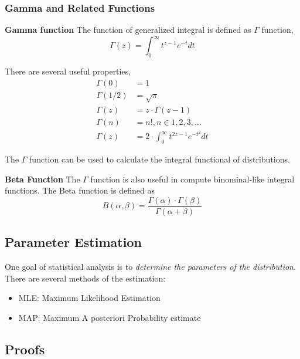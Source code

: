 \documentclass[../main.tex]{subfiles}
\begin{document}
\subsubsection{Gamma and Related Functions}
\textbf{Gamma function}
The function of generalized integral is defined as $\Gamma$ function,
\begin{equation}
    \label{Definition: Gamma function}
    \Gamma(z) = \int_{0}^{\infty} t^{z-1} e^{-t} dt
\end{equation}

There are several useful properties,
\begin{equation}
    \label{Property: Gamma function}
    \begin{split}
        \Gamma(0) & = 1 \\
        \Gamma(1/2) & = \sqrt{\pi} \\
        \Gamma(z) & = z \cdot \Gamma(z-1) \\
        \Gamma(n) & = n!, n \in {1, 2, 3, \dots} \\
        \Gamma(z) & = 2 \cdot \int_{0}^{\infty} t^{2z-1} e^{-t^2} dt
    \end{split}
\end{equation}

The $\Gamma$ function can be used to calculate the integral functional of distributions.

\textbf{Beta Function}
The $\Gamma$ function is also useful in compute binominal-like integral functions.
The Beta function is defined as
\begin{equation}
    \label{Definition: Beta Function}
    B(\alpha, \beta) = \frac{\Gamma(\alpha) \cdot \Gamma(\beta)}{\Gamma(\alpha + \beta)}
\end{equation}

\subsection{Parameter Estimation}
One goal of statistical analysis is to \emph{determine the parameters of the distribution}.
There are several methods of the estimation:
\begin{itemize}
    \item MLE: Maximum Likelihood Estimation
    \item MAP: Maximum A posteriori Probability estimate
\end{itemize}

\begin{subappendices}

    \subsection{Proofs}
    
    
    

\end{subappendices}
\end{document}
